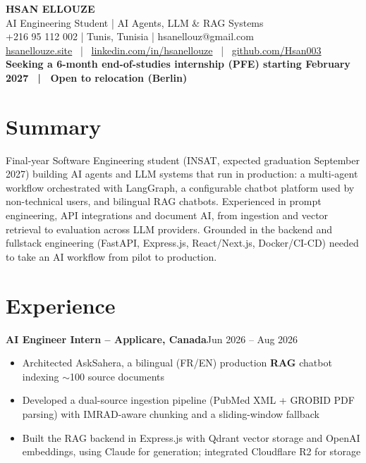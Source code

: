 \documentclass[10pt,a4paper]{article}
\newcommand{\entry}[2]{\vspace{1pt}\noindent\textbf{#1}\hfill{\color{muted}#2}\par}
\begin{document}
\begin{center}
  {\LARGE\bfseries HSAN ELLOUZE}\\[2pt]
  {\color{muted} AI Engineering Student | AI Agents, LLM \& RAG Systems}\\[2pt]
  {\footnotesize +216 95 112 002 | Tunis, Tunisia | hsanellouz@gmail.com}\\[1pt]
  {\footnotesize \href{https://hsanellouze.site}{hsanellouze.site} \ | \ \href{https://linkedin.com/in/hsanellouze}{linkedin.com/in/hsanellouze} \ | \ \href{https://github.com/Hsan003}{github.com/Hsan003}}\\[3pt]
  {\footnotesize\bfseries Seeking a 6-month end-of-studies internship (PFE) starting February 2027 \ | \ Open to relocation (Berlin)}
\end{center}

\section{Summary}
Final-year Software Engineering student (INSAT, expected graduation September 2027) building AI agents and LLM systems that run in production: a multi-agent workflow orchestrated with LangGraph, a configurable chatbot platform used by non-technical users, and bilingual RAG chatbots. Experienced in prompt engineering, API integrations and document AI, from ingestion and vector retrieval to evaluation across LLM providers. Grounded in the backend and fullstack engineering (FastAPI, Express.js, React/Next.js, Docker/CI-CD) needed to take an AI workflow from pilot to production.

\section{Experience}
\entry{AI Engineer Intern -- Applicare, Canada}{Jun 2026 -- Aug 2026}
\begin{itemize}
  \item Architected AskSahera, a bilingual (FR/EN) production \textbf{RAG} chatbot indexing $\sim$100 source documents
  \item Developed a dual-source ingestion pipeline (PubMed XML + GROBID PDF parsing) with IMRAD-aware chunking and a sliding-window fallback
  \item Built the RAG backend in Express.js with Qdrant vector storage and OpenAI embeddings, using Claude for generation; integrated Cloudflare R2 for storage
\end{itemize}
\end{document}
